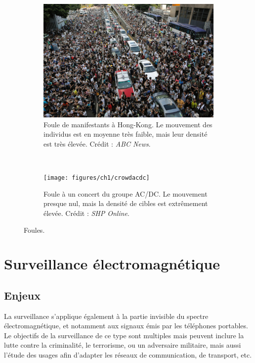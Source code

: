 	\begin{figure}[htb]
		\begin{subfigure}[t]{0.5\textwidth}
		\centering
		\includegraphics[width=\textwidth]{figures/ch1/crowdhk}
		\caption[Foule de manifestants à Hong-Kong.]{Foule de manifestants à Hong-Kong. Le mouvement des individus est en moyenne très faible, mais leur densité est très élevée. Crédit : \emph{ABC News}\footnotemark.}
		\label{fig:crowdhk}
		\end{subfigure}
		~
		\begin{subfigure}[t]{0.5\textwidth}
		\centering
		\texttt{[image: figures/ch1/crowdacdc]}
		\caption[Foule à un concert.]{Foule à un concert du groupe AC/DC. Le mouvement presque nul, mais la densité de cibles est extrêmement élevée. Crédit : \emph{SHP Online}\footnotemark.}
		\label{fig:crowdacdc}
		\end{subfigure}
		\label{fig:crowds}
		\caption{Foules.}
	\end{figure}
	
	\addtocounter{footnote}{-1}
	\addtocounter{footnote}{1}
	
	\section{Surveillance électromagnétique}
	\subsection{Enjeux}
	La surveillance s'applique également à la partie invisible du spectre électromagnétique, et notamment aux signaux émis par les téléphones portables.  Le objectifs de la surveillance de ce type sont multiples mais peuvent inclure la lutte contre la criminalité, le terrorisme, ou un adversaire militaire, mais aussi l'étude des usages afin d'adapter les réseaux de communication, de transport, etc.
	
